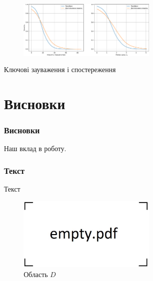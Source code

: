 \documentclass{beamer}
\numberwithin{equation}{section}
\begin{document}
	\begin{frame}

		\begin{figure}[h]
			\centering
			\includegraphics[width=0.6\textwidth]{../images/distAllT7.pdf}
			
		\end{figure}
	
	    Ключові зауваження і спостереження
	\end{frame}

	
	
	
	\section{Висновки}
	\begin{frame}
		\frametitle{Висновки}
		
		Наш вклад в роботу.
	\end{frame}
	
	
	
		
	\begin{frame}
		\frametitle{Текст}
		Текст
		\begin{figure}[h]
			\centering
			\includegraphics[width=0.6\textwidth]{../images/empty.pdf}
			
			\caption{Область $D$}
			\label{fig:double-connected-region}
		\end{figure}
	\end{frame}
	
\end{document}
